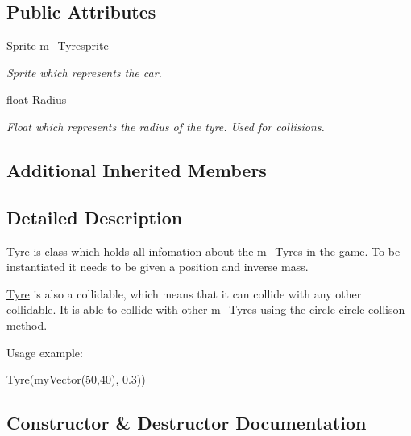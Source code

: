 \subsection*{Public Attributes}
\begin{DoxyCompactItemize}
\item 
\hypertarget{class_tyre_af0e442ef7f1d1198a452f165df7a9237}{}Sprite \hyperlink{class_tyre_af0e442ef7f1d1198a452f165df7a9237}{m\+\_\+\+Tyresprite}\label{class_tyre_af0e442ef7f1d1198a452f165df7a9237}

\begin{DoxyCompactList}\small\item\em Sprite which represents the car. \end{DoxyCompactList}\item 
\hypertarget{class_tyre_a1c0fd8531b72c94915867cb90dd175c9}{}float \hyperlink{class_tyre_a1c0fd8531b72c94915867cb90dd175c9}{Radius}\label{class_tyre_a1c0fd8531b72c94915867cb90dd175c9}

\begin{DoxyCompactList}\small\item\em Float which represents the radius of the tyre. Used for collisions. \end{DoxyCompactList}\end{DoxyCompactItemize}
\subsection*{Additional Inherited Members}


\subsection{Detailed Description}
\hyperlink{class_tyre}{Tyre} is class which holds all infomation about the m\+\_\+\+Tyres in the game. To be instantiated it needs to be given a position and inverse mass.

\hyperlink{class_tyre}{Tyre} is also a collidable, which means that it can collide with any other collidable. It is able to collide with other m\+\_\+\+Tyres using the circle-\/circle collison method.

Usage example\+: 
\begin{DoxyCode}
\hyperlink{class_tyre_a162dbaad7ae74443df530dfb147fb694}{Tyre}(\hyperlink{classmy_vector}{myVector}(50,40), 0.3))
\end{DoxyCode}
 

\subsection{Constructor \& Destructor Documentation}
\hypertarget{class_tyre_a162dbaad7ae74443df530dfb147fb694}{}
